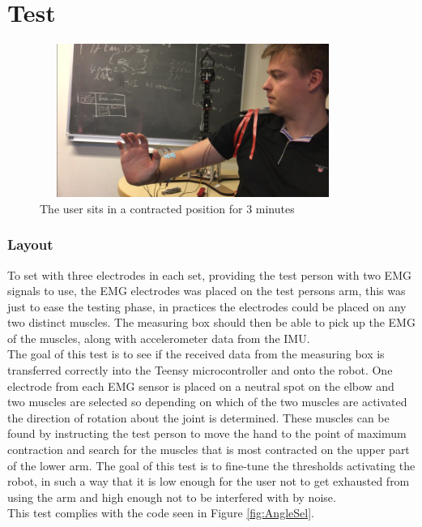 \chapter{Test}\label{Test}

\label{test:Connectiontest}
\begin{figure}[H]
    \centering
    \includegraphics[width=10cm,height=5cm]{Figures/Technical_figures/image2.png}
    \caption{The user sits in a contracted position for 3 minutes}
    \label{fig:connectiontest}
\end{figure}
\subsection*{Layout}
To set with three electrodes in each set, providing the test person with two EMG signals to use, the EMG electrodes was placed on the test persons arm, this was just to ease the testing phase, in practices the electrodes could be placed on any two distinct muscles. The measuring box should then be able to pick up the EMG of the muscles, along with accelerometer data from the IMU.\\
The goal of this test is to see if the received data from the measuring box is transferred correctly into the Teensy microcontroller and onto the robot. One electrode from each EMG sensor is placed on a neutral spot on the elbow and two muscles are selected so depending on which of the two muscles are activated the direction of rotation about the joint is determined. These muscles can be found by instructing the test person to move the hand to the point of maximum contraction and search for the muscles that is most contracted on the upper part of the lower arm.
 The goal of this test is to fine-tune the thresholds activating the robot, in such a way that it is low enough for the user not to get exhausted from using the arm and high enough not to be interfered with by noise.\\
This test complies with the code seen in Figure \ref{fig:AngleSel}.\\
